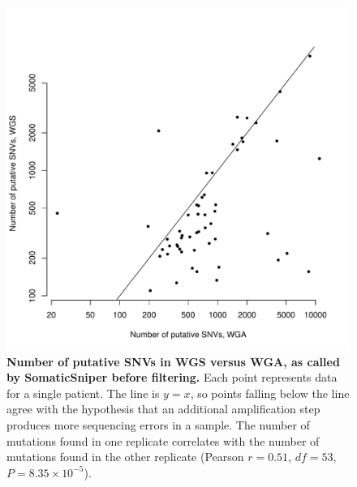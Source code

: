 \documentclass[11 pt]{article} %
\begin{document}
\begin{figure}
\centerline{
\includegraphics[width=5in]{Figure2.pdf} }
\caption{\textbf{Number of putative SNVs in WGS versus WGA, as called by SomaticSniper before filtering.} Each point represents data for a single patient. The line is $y=x$, so points falling below the line agree with the hypothesis that an additional amplification step produces more sequencing errors in a sample. The number of mutations found in one replicate correlates with the number of mutations found in the other replicate (Pearson $r=0.51$, $df = 53$, $P = 8.35\times 10^{-5}$).}
\label{fig:C282_v_C484}
\end{figure}
\end{document}

